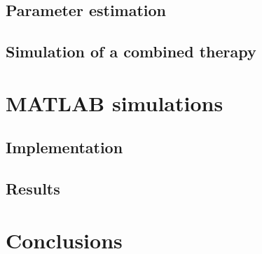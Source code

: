 \documentclass[fleqn,10pt]{SelfArx} %
\begin{document}
\subsection{Parameter estimation}


\subsection{Simulation of a combined therapy}



\section{MATLAB simulations}
\subsection{Implementation}


\subsection{Results}


\section{Conclusions} %


\printbibliography
%
%

\end{document}
